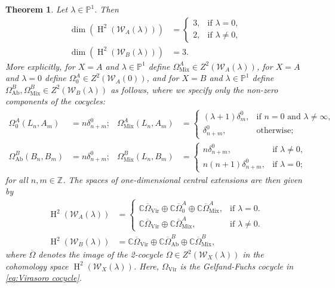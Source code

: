 \documentclass[11pt, svgnames]{amsart}
\DeclareMathOperator{\Vir}{Vir}
\newcommand{\ZZ}{\mathbb{Z}}
\newcommand{\CC}{\mathbb{C}}
\newcommand{\PP}{\mathbb{P}}
\newcommand{\W}{\mathcal{W}}
\DeclareMathOperator{\HH}{H}
\DeclareMathOperator{\Ab}{Ab}
\DeclareMathOperator{\Mix}{Mix}
\newtheorem{theorem}[proposition]{Theorem}
\theoremstyle{definition}
\begin{document}
\begin{theorem}\label{thm:main}
    Let $\lambda \in \PP^1$. Then
    \begin{align*}
        \dim(\HH^2(\W_A(\lambda))) &= \begin{cases}
            3, &\text{if } \lambda = 0,\\
            2, &\text{if } \lambda \neq 0,
        \end{cases}\\
        \dim(\HH^2(\W_B(\lambda))) &= 3.
    \end{align*}
    More explicitly, for $X = A$ and $\lambda \in \PP^1$ define $\Omega_{\Mix}^A \in Z^2(\W_A(\lambda))$, for $X = A$ and $\lambda = 0$ define $\Omega_0^A \in Z^2(\W_A(0))$, and for $X = B$ and $\lambda \in \PP^1$ define $\Omega_{\Ab}^B, \Omega_{\Mix}^B \in Z^2(\W_B(\lambda))$ as follows, where we specify only the non-zero components of the cocycles:
    \begin{align*}
        \Omega_0^A (L_n, A_m) &= n\delta^0_{n+m}; & \Omega_{\Mix}^A (L_n, A_m) &= \begin{cases}
            (\lambda + 1)\delta_m^0, &\text{if } n = 0 \text{ and } \lambda \neq \infty, \\
            \delta_{n+m}^0, &\text{otherwise};
        \end{cases} \\
        \Omega_{\Ab}^B (B_n, B_m) &= n\delta^0_{n+m}; & \Omega_{\Mix}^B(L_n, B_m) &= \begin{cases}
            n\delta^0_{n+m}, &\text{if } \lambda \neq 0, \\
            n(n + 1)\delta^0_{n+m}, &\text{if } \lambda = 0;
        \end{cases}
    \end{align*}
    for all $n,m \in \ZZ$. The spaces of one-dimensional central extensions are then given by
    \begin{align*}
        \HH^2(\W_A(\lambda)) &=
        \begin{cases}
            \CC \overline{\Omega}_{\Vir} \oplus \CC \overline{\Omega}_0^A \oplus \CC \overline{\Omega}_{\Mix}^A, &\text{if } \lambda=0.\\
            \CC \overline{\Omega}_{\Vir} \oplus \CC \overline{\Omega}_{\Mix}^A, &\text{if } \lambda \neq 0.
        \end{cases} \\
        \HH^2(\W_B(\lambda)) &= \CC \overline{\Omega}_{\Vir} \oplus \CC \overline{\Omega}_{\Ab}^B \oplus \CC \overline{\Omega}_{\Mix}^B,
    \end{align*}
    where $\overline{\Omega}$ denotes the image of the 2-cocycle $\Omega \in Z^2(\W_X(\lambda))$ in the cohomology space $\HH^2(\W_X(\lambda))$. Here, $\Omega_{\Vir}$ is the Gelfand-Fuchs cocycle in \eqref{eq:Virasoro cocycle}.
\end{theorem}
\end{document}
